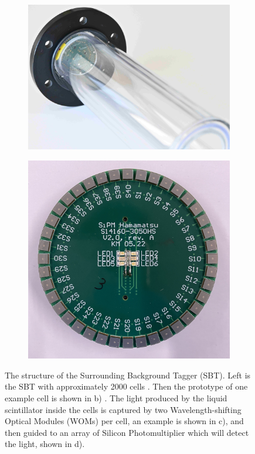 \begin{figure}
\begin{subfigure}[b]{0.24\textwidth}
		\caption{}
		\label{fig:sbt_structure_cell}
	\end{subfigure}
	\begin{subfigure}[b]{0.21\textwidth}
		\centering
		\includegraphics[width=1.\textwidth]{pictures/pmma_vessel}
		\caption{}
		\label{fig:sbt_structure_pmma}
	\end{subfigure}
	\begin{subfigure}[b]{0.20\textwidth}
		\centering
		\includegraphics[width=1.\textwidth]{pictures/sipm_ham_pcb_front}
		\caption{}
		\label{fig:sbt_structure_sipm}
	\end{subfigure}
	\caption[Overview of the Surrounding Background Tagger]{The structure of the Surrounding Background Tagger (SBT). Left is the SBT with approximately 2000 cells \cite{Ahdida:2704147}. Then the prototype of one example cell is shown in b) \cite{fairhurst}. The light produced by the liquid scintillator inside the cells is captured by two Wavelength-shifting Optical Modules (WOMs) per cell, an example is shown in c), and then guided to an array of Silicon Photomultiplier which will detect the light, shown in d).}
 	\label{fig:sbt}
\end{figure}

